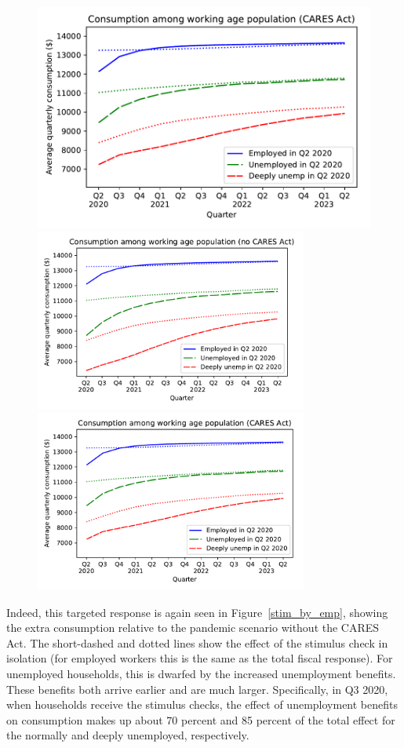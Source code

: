 \documentclass[titlepage,letterpaper]{\econtex}
\begin{document}
\begin{figure}
{    \includegraphics[width=0.8\webWidth\textwidth]{./Figures/ConRespByEmpStateWStim}
  } %
  { \includegraphics[width=0.8\textwidth]{./Figures/ConRespByEmpStateNoStim}
    \includegraphics[width=0.8\textwidth]{./Figures/ConRespByEmpStateWStim}}
\end{figure}

Indeed, this targeted response is again seen in Figure~\ref{stim_by_emp},
showing the extra consumption relative to the pandemic scenario without the CARES Act.
The short-dashed and dotted lines show the effect of the stimulus check in isolation (for employed workers this is the same as the total fiscal response).
For unemployed households, this is dwarfed by the increased unemployment benefits.
These benefits both arrive earlier and are much larger.
Specifically, in Q3 2020, when households receive the stimulus checks, the effect of unemployment benefits on consumption makes up about 70 percent and 85 percent of the total effect for the normally and deeply unemployed, respectively.
\end{document}

